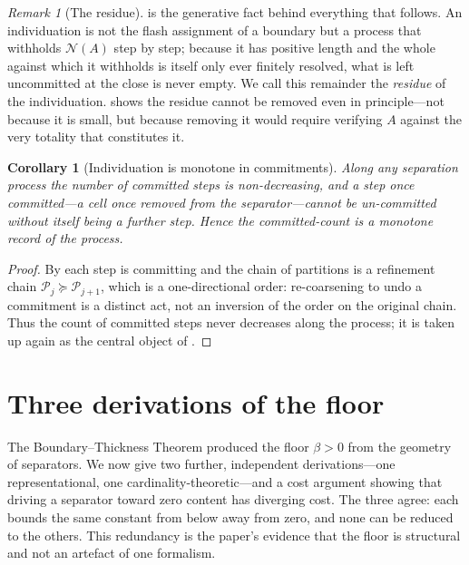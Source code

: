 \documentclass[11pt,a4paper]{article}
\theoremstyle{thmstyle}
\newtheorem{corollary}[theorem]{Corollary}
\theoremstyle{definition}
\theoremstyle{remark}
\newtheorem{remark}[theorem]{Remark}
\newcommand{\thick}{\beta}
\newcommand{\Part}{\mathscr{P}}
\newcommand{\Neg}{\mathcal{N}}
\begin{document}
\begin{remark}[The residue]
\label{rem:residue-origin}
 is the generative fact behind everything that follows. An
individuation is not the flash assignment of a boundary but a process that
withholds $\Neg(A)$ step by step; because it has positive length and the whole
against which it withholds is itself only ever finitely resolved, what is left
uncommitted at the close is never empty. We call this remainder the
\emph{residue} of the individuation.  shows the residue cannot
be removed even in principle---not because it is small, but because removing it
would require verifying $A$ against the very totality that constitutes it.
\end{remark}

\begin{corollary}[Individuation is monotone in commitments]
\label{cor:monotone-commit}
Along any separation process the number of committed steps is non-decreasing, and
a step once committed---a cell once removed from the separator---cannot be
un-committed without itself being a further step. Hence the committed-count is a
monotone record of the process.
\end{corollary}

\begin{proof}
By  each step is committing and the chain of partitions is a
refinement chain $\Part_j\succeq\Part_{j+1}$, which is a one-directional order:
re-coarsening to undo a commitment is a distinct act, not an inversion of the
order on the original chain. Thus the count of committed steps never decreases
along the process; it is taken up again as the central object of
.
\end{proof}


\section{Three derivations of the floor}
\label{sec:floor}

The Boundary--Thickness Theorem produced the floor $\thick>0$ from the geometry
of separators. We now give two further, independent derivations---one
representational, one cardinality-theoretic---and a cost argument showing that
driving a separator toward zero content has diverging cost. The three agree:
each bounds the same constant from below away from zero, and none can be reduced
to the others. This redundancy is the paper's evidence that the floor is
structural and not an artefact of one formalism.
\end{document}
